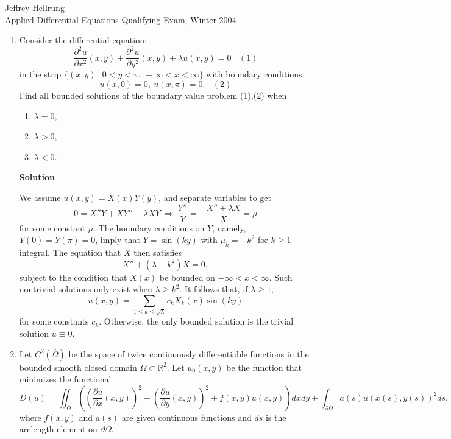 \documentclass{article}
\begin{document}
\begin{flushright}
Jeffrey Hellrung \\
Applied Differential Equations Qualifying Exam, Winter 2004 \\
\end{flushright}


\begin{enumerate}

\item Consider the differential equation:
\[\frac{\partial^2 u}{\partial x^2}(x,y) + \frac{\partial^2 u}{\partial y^2}(x,y) + \lambda u(x,y) = 0 \ \ \ \ (1)\]
in the strip \(\{(x,y) \ | \ 0 < y < \pi, \ -\infty < x < \infty\}\) with boundary conditions
\[u(x,0) = 0, \ u(x,\pi) = 0. \ \ \ \ (2)\]
Find all bounded solutions of the boundary value problem (1),(2) when
\begin{enumerate}
\item \(\lambda = 0\),
\item \(\lambda > 0\),
\item \(\lambda < 0\).
\end{enumerate}

{\bf Solution}

We assume \(u(x,y) = X(x) Y(y)\), and separate variables to get
\[0 = X'' Y + X Y'' + \lambda X Y \ \Rightarrow \ \frac{Y''}{Y} = -\frac{X'' + \lambda X}{X} = \mu\]
for some constant \(\mu\).  The boundary conditions on \(Y\), namely, \(Y(0) = Y(\pi) = 0\), imply that \(Y = \sin(k y)\) with \(\mu_k = -k^2\) for \(k \geq 1\) integral.  The equation that \(X\) then satisfies
\[X'' + (\lambda - k^2) X = 0,\]
subject to the condition that \(X(x)\) be bounded on \(-\infty < x < \infty\).  Such nontrivial solutions only exist when \(\lambda \geq k^2\).  It follows that, if \(\lambda \geq 1\),
\[u(x,y) = \sum_{1 \leq k \leq \sqrt{\lambda}} c_k X_k(x) \sin(k y)\]
for some constants \(c_k\).  Otherwise, the only bounded solution is the trivial solution \(u \equiv 0\).



\item Let \(C^2 \left( \overline{\Omega} \right)\) be the space of twice continuously differentiable functions in the bounded smooth closed domain \(\overline{\Omega} \subset \mathbb{R}^2\).  Let \(u_0(x,y)\) be the function that minimizes the functional
\[D(u) = \iint_{\Omega} \left( \left( \frac{\partial u}{\partial x}(x,y) \right)^2 + \left( \frac{\partial u}{\partial y}(x,y) \right)^2 + f(x,y) u(x,y) \right) dx dy + \int_{\partial\Omega} a(s) u(x(s),y(s))^2 ds,\]
where \(f(x,y)\) and \(a(s)\) are given continuous functions and \(ds\) is the arclength element on \(\partial\Omega\).


\end{enumerate}
\end{document}
